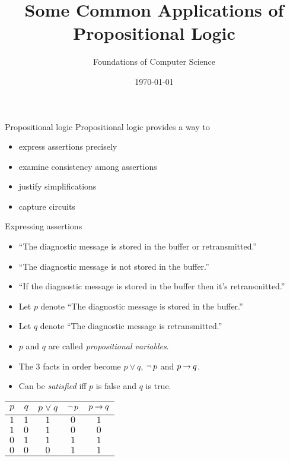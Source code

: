 \documentclass[style=sailor,size=12pt]{powerdot}
\title{Some Common Applications of Propositional Logic}
\author{Foundations of Computer Science}
\date{\today}
\begin{document}
\maketitle

\begin{wideslide}[bm=,toc=]{Propositional logic}
Propositional logic provides a way to
\begin{itemize}
\item express assertions precisely
\item examine consistency among assertions
\item justify simplifications
\item capture circuits
\end{itemize}
\end{wideslide}

\begin{wideslide}[bm=,toc=]{Expressing assertions}
\begin{itemize}
\item ``The diagnostic message is stored in the buffer or retransmitted.''
\item ``The diagnostic message is not stored in the buffer.''
\item ``If the diagnostic message is stored in the buffer then it's retransmitted.''
\item Let $p$ denote ``The diagnostic message is stored in the buffer.''
\item Let $q$ denote ``The diagnostic message is retransmitted.''
\item $p$ and $q$ are called {\em propositional variables\/}.
\item The 3 facts in order become $p\lor q$, $\mathop{\neg} p$ and $p \mathbin{\rightarrow} q$.
\item Can be {\em satisfied\/} iff $p$ is false and $q$ is true.
\end{itemize}
\begin{center}
\begin{tabular}{c|c||c|c|c}
$p$ & $q$ & $p \lor q$ & $\mathop{\neg} p$ & $p \mathbin{\rightarrow} q$ \\
\hline
$1$ & $1$ & $1$ & $0$ & $1$ \\
$1$ & $0$ & $1$ & $0$ & $0$ \\
$0$ & $1$ & $1$ & $1$ & $1$ \\
$0$ & $0$ & $0$ & $1$ & $1$ 
\end{tabular}
\end{center}


\end{wideslide}
\end{document}
